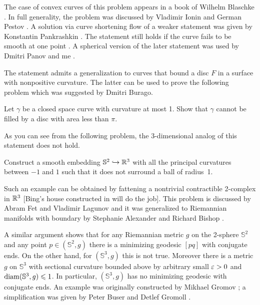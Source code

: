 The case of convex curves of this problem appears in a book of Wilhelm Blaschke \cite[see \S 24 in][]{blaschke}.
In full generality, the problem was discussed by Vladimir Ionin and German Pestov \cite{pestov-ionin}. %
A solution via curve shortening flow of a weaker statement 
was given by Konstantin Pankrashkin \cite{pankrashkin}.
The statement still holds if the curve fails to be smooth at one point \cite{petrunin-zamora:moon}.
A spherical version of the later statement 
was used by Dmitri Panov and me \cite{panov-petrunin-ramification}.

The statement admits a generalization to curves that bound a disc $F$ in a surface with nonpositive curvature.
The latter can be used to prove the following problem which was suggested by Dmitri Burago.

\begin{pr}
Let $\gamma$ be a closed space curve with curvature at most 1.
Show that $\gamma$ cannot be filled by a disc with area less than $\pi$.
\end{pr}


As you can see from the following problem, the 3-dimensional analog of this statement does not hold.

\begin{pr}
Construct a smooth embedding $\mathbb{S}^2\hookrightarrow \mathbb{R}^3$ 
with all the principal curvatures between $-1$ and $1$
such that it does not surround a ball of radius~1.
\end{pr}

Such an example can be obtained by fattening a nontrivial contractible 2-complex in $\mathbb{R}^3$ 
[Bing's house constructed in  will do the job].
This problem is discussed by Abram Fet and Vladimir Lagunov \cite{lagunov-2,lagunov-fet-1,lagunov-fet-2} 
and it was generalized to Riemannian manifolds with boundary by Stephanie Alexander and Richard Bishop \cite{alexander-bishop}.

A similar argument shows that for any Riemannian metric $g$ on the 2-sphere $\mathbb S^2$ 
and any point $p\in(\mathbb S^2,g)$ there is a minimizing geodesic $[pq]$ with conjugate ends.
On the other hand, for $(\mathbb S^3,g)$ this is not true.
Moreover there is a metric $g$ on $\mathbb{S}^3$ 
with sectional curvature bounded above by arbitrary small $\varepsilon>0$ and $\operatorname{\rm diam}\nolimits(\mathbb{S}^3,g)\leqslant 1$.
In particular, $(\mathbb S^3,g)$ has no minimizing geodesic with conjugate ends.
An example was originally constructed by Mikhael Gromov \cite{gromov-almost-flat}; 
a simplification was given by 
Peter Buser
and Detlef Gromoll \cite{buser-gromoll}.

